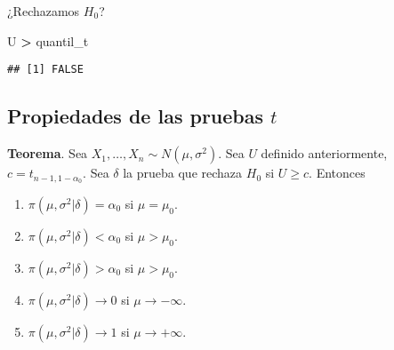 \documentclass[
  12pt,
]{book}
\newenvironment{Shaded}{\begin{snugshade}}{\end{snugshade}}
\newcommand{\DataTypeTok}[1]{\textcolor[rgb]{0.13,0.29,0.53}{#1}}
\newcommand{\DecValTok}[1]{\textcolor[rgb]{0.00,0.00,0.81}{#1}}
\newcommand{\FloatTok}[1]{\textcolor[rgb]{0.00,0.00,0.81}{#1}}
\newcommand{\KeywordTok}[1]{\textcolor[rgb]{0.13,0.29,0.53}{\textbf{#1}}}
\newcommand{\NormalTok}[1]{#1}
\newcommand{\OperatorTok}[1]{\textcolor[rgb]{0.81,0.36,0.00}{\textbf{#1}}}
\newcommand{\StringTok}[1]{\textcolor[rgb]{0.31,0.60,0.02}{#1}}
\begin{document}
\begin{Shaded}
\end{Shaded}

¿Rechazamos \(H_0\)?

\begin{Shaded}
\begin{Highlighting}[]
\NormalTok{U }\OperatorTok{\textgreater{}}\StringTok{ }\NormalTok{quantil\_t}
\end{Highlighting}
\end{Shaded}

\begin{verbatim}
## [1] FALSE
\end{verbatim}

\hypertarget{propiedades-de-las-pruebas-t}{%
\subsection{\texorpdfstring{Propiedades de las pruebas \(t\)}{Propiedades de las pruebas t}}\label{propiedades-de-las-pruebas-t}}

\textbf{Teorema}. Sea \(X_1,\dots,X_n\sim N(\mu,\sigma^2)\). Sea \(U\) definido
anteriormente, \(c=t_{n-1,1-\alpha_0}\). Sea \(\delta\) la prueba que rechaza \(H_0\)
si \(U\geq c\). Entonces

\begin{enumerate}
\def\labelenumi{\roman{enumi})}
\item
  \(\pi(\mu,\sigma^2|\delta) = \alpha_0\) si \(\mu=\mu_0\).
\item
  \(\pi(\mu,\sigma^2|\delta) < \alpha_0\) si \(\mu>\mu_0\).
\item
  \(\pi(\mu,\sigma^2|\delta) >\alpha_0\) si \(\mu>\mu_0\).
\item
  \(\pi(\mu,\sigma^2|\delta) \to 0\) si \(\mu\to-\infty\).
\item
  \(\pi(\mu,\sigma^2|\delta) \to 1\) si \(\mu\to+\infty\).
\end{enumerate}
\end{document}
